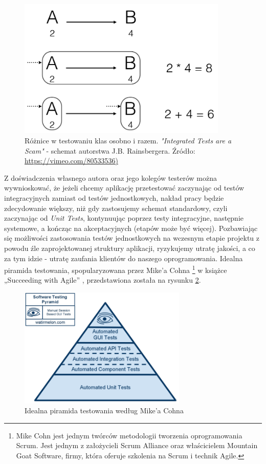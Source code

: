 \begin{figure}[!htb]
    \centering
    \includegraphics[width=10cm]{imgs/ch3_przyklad_testowania_klas.png}
    \caption
{Różnice w testowaniu klas osobno i razem. \textit{"Integrated Tests are a Scam"} - schemat autorstwa J.B. Rainsbergera. Źródło: \url{https://vimeo.com/80533536)}}
    \label{fig:testowanie_klas}
\end{figure} 


\newpage
Z doświadczenia własnego autora oraz jego kolegów testerów można wywnioskować, że jeżeli chcemy aplikację przetestować zaczynając od testów integracyjnych zamiast od testów jednostkowych, nakład pracy będzie zdecydowanie większy, niż gdy zastosujemy schemat standardowy, czyli zaczynając od \textit{Unit Tests}, kontynuując poprzez testy integracyjne, następnie systemowe, a kończąc na akceptacyjnych (etapów może być więcej). Pozbawiając się możliwości zastosowania testów jednostkowych na wczesnym etapie projektu z powodu źle zaprojektowanej struktury aplikacji, ryzykujemy utratę jakości, a co za tym idzie - utratę zaufania klientów do naszego oprogramowania. Idealna piramida testowania, spopularyzowana przez Mike’a Cohna \footnote{Mike Cohn jest jednym twórców metodologii tworzenia oprogramowania Scrum. Jest jednym z założycieli Scrum Alliance oraz właścicielem Mountain Goat Software, firmy, która oferuje szkolenia na Scrum i technik Agile.}  w książce „Succeeding with Agile” \cite{bib:cohn:agile}, przedstawiona została na rysunku \ref{fig:idealna_piramida}.

\begin{figure}[!htb]
    \centering
    \includegraphics[width=8cm]{imgs/ch3_idealna_piramida.png}
    \caption
{Idealna piramida testowania według Mike'a Cohna\cite{bib:cohn:agile}}
    \label{fig:idealna_piramida}
\end{figure} 

